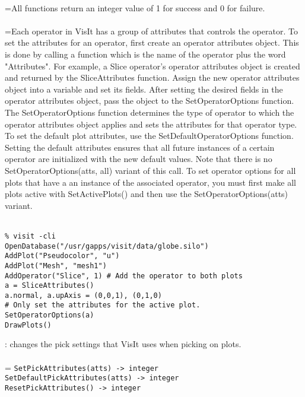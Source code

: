 \documentclass[10pt,a4paper]{report}
\begin{document}
 \\ 
\hangindent=\parindent All functions return an integer value of 1 for success and 0 for failure. \\[-3mm] 

 \\ 
\hangindent=\parindent Each operator in VisIt has a group of attributes that controls the operator. To set the attributes for an operator, first create an operator attributes object. This is done by calling a function which is the name of the operator plus the word "Attributes". For example, a Slice operator's operator attributes object is created and returned by the SliceAttributes function. Assign the new operator attributes object into a variable and set its fields. After setting the desired fields in the operator attributes object, pass the object to the SetOperatorOptions function. The SetOperatorOptions function determines the type of operator to which the operator attributes object applies and sets the attributes for that operator type. To set the default plot attributes, use the SetDefaultOperatorOptions function. Setting the default attributes ensures that all future instances of a certain operator are initialized with the new default values. Note that there is no SetOperatorOptions(atts, all) variant of this call. To set operator options for all plots that have a an instance of the associated operator, you must first make all plots active with SetActivePlots() and then use the SetOperatorOptions(atts) variant. \\[-3mm] 

\\[-6mm]
\begin{verbatim}% visit -cli
OpenDatabase("/usr/gapps/visit/data/globe.silo")
AddPlot("Pseudocolor", "u")
AddPlot("Mesh", "mesh1")
AddOperator("Slice", 1) # Add the operator to both plots
a = SliceAttributes()
a.normal, a.upAxis = (0,0,1), (0,1,0)
# Only set the attributes for the active plot.
SetOperatorOptions(a)
DrawPlots()
\end{verbatim}
\newpage


{}
: changes the pick settings that VisIt uses when picking on plots.\\[-3mm]

 \\ 
\hangindent=\parindent 
\verb!SetPickAttributes(atts) -> integer!\\ 
\verb!SetDefaultPickAttributes(atts) -> integer!\\ 
\verb!ResetPickAttributes() -> integer!\\ [-3mm]
\end{document}
